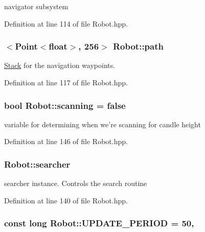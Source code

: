 navigator subsystem 



Definition at line 114 of file Robot.\-hpp.

\hypertarget{classRobot_a36d071e82aea40470cea9559477e5115}{
\subsubsection[{path}]{$<${\bf Point}$<$float$>$, 256$>$ Robot\-::path}}\label{classRobot_a36d071e82aea40470cea9559477e5115}


\hyperlink{classStack}{Stack} for the navigation waypoints. 



Definition at line 117 of file Robot.\-hpp.

\hypertarget{classRobot_adcfb83201cfb8c8a7588d83aae0fc5be}{
\subsubsection[{scanning}]{\setlength{\rightskip}{0pt plus 5cm}bool Robot\-::scanning = false\hspace{0.3cm}{\ttfamily [private]}}}\label{classRobot_adcfb83201cfb8c8a7588d83aae0fc5be}


variable for determining when we're scanning for candle height 



Definition at line 146 of file Robot.\-hpp.

\hypertarget{classRobot_af0ba30c47b84dc976f5bb7bd978f95ef}{
\subsubsection[{searcher}]{ Robot\-::searcher\hspace{0.3cm}{\ttfamily [private]}}}\label{classRobot_af0ba30c47b84dc976f5bb7bd978f95ef}


searcher instance. Controls the search routine 



Definition at line 140 of file Robot.\-hpp.

\hypertarget{classRobot_a6a76c7da686c2cec0cba2877e0c914dc}{
\subsubsection[{U\-P\-D\-A\-T\-E\-\_\-\-P\-E\-R\-I\-O\-D}]{\setlength{\rightskip}{0pt plus 5cm}const long Robot\-::\-U\-P\-D\-A\-T\-E\-\_\-\-P\-E\-R\-I\-O\-D = 50\hspace{0.3cm}{\ttfamily [static]}, {\ttfamily [private]}}}\label{classRobot_a6a76c7da686c2cec0cba2877e0c914dc}


